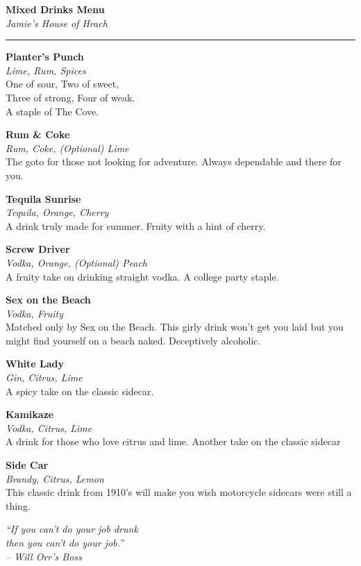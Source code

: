 \documentclass[12pt]{article}
\newcommand{\drink}[3]{
    \begin{center}
        \noindent\large \textbf{#1}
        \\\small \textit{#2}\\
        \normalsize #3 \\
        \vspace{8 mm}
    \end{center}
}
\begin{document}


\begin{center}
    \LARGE \textbf{Mixed Drinks Menu} \\
    \small \textit{Jamie's House of Hrach} \\
    \noindent\rule{6in}{0.4pt}
\end{center}

\begin{multicols}{2}
    \drink{Planter's Punch}{Lime, Rum, Spices}{
        One of sour, Two of sweet, \\
        Three of strong, Four of weak.\\
        A staple of The Cove.
    }

    \drink{Rum \& Coke}{Rum, Coke, (Optional) Lime}{
        The goto for those not looking for adventure.
        Always dependable and there for you.
    }

    \drink{Tequila Sunrise}{Tequila, Orange, Cherry}{
        A drink truly made for summer. Fruity with a hint of cherry.
    }

    \drink{Screw Driver}{Vodka, Orange, (Optional) Peach}{
        A fruity take on drinking straight vodka. A college party staple.
    }

    \columnbreak

    \drink{Sex on the Beach}{Vodka, Fruity}{
        Matched only by Sex on the Beach. This girly drink won't get you laid
        but you might find yourself on a beach naked. Deceptively alcoholic.
    }

   \drink{White Lady}{Gin, Citrus, Lime}{
      A spicy take on the classic sidecar.
   }

   \drink{Kamikaze}{Vodka, Citrus, Lime}{
      A drink for those who love citrus and lime. Another take on the classic
      sidecar
   }

   \drink{Side Car}{Brandy, Citrus, Lemon}{
      This classic drink from 1910's will make you wish motorcycle sidecars
      were still a thing.
   }

\end{multicols}

\vfill
\begin{center}
    \noindent\textit{
       ``If you can't do your job drunk \\
       then you can't do your job.'' \\
       -- Will Orr's Boss
    }
\end{center}
\end{document}
